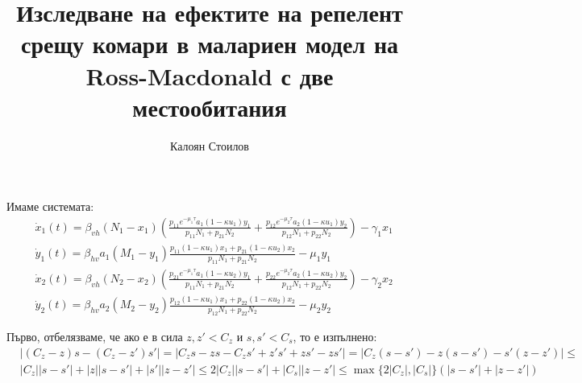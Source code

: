 \documentclass[bulgarian, 12pt]{article}
\title{Изследване на ефектите на репелент срещу комари в малариен модел на Ross-Macdonald с две местообитания}
\author{Калоян Стоилов}
\begin{document}
\maketitle
Имаме системата:
\begin{align*}
  &\dot{x}_1(t) = \beta_{vh} (N_1-x_1) \left(\frac{p_{11} e^{-\mu_1 \tau} a_1 (1-\kappa u_1) y_1}{p_{11} N_1 + p_{21} N_2} + \frac{p_{12} e^{-\mu_2 \tau} a_2 (1-\kappa u_1) y_2}{p_{12} N_1 + p_{22} N_2 }\right) - \gamma_1 x_1 \\
  &\dot{y}_1(t) = \beta_{hv} a_1 (M_1-y_1) \frac{p_{11} (1-\kappa u_1) x_1 + p_{21} (1-\kappa u_2) x_2}{p_{11} N_1 + p_{21} N_2} - \mu_1 y_1 \\
  &\dot{x}_2(t) = \beta_{vh} (N_2-x_2) \left(\frac{p_{21} e^{-\mu_1 \tau} a_1 (1-\kappa u_2) y_1}{p_{11} N_1 + p_{21} N_2 } + \frac{p_{22} e^{-\mu_2 \tau} a_2 (1-\kappa u_2) y_2}{p_{12} N_1 + p_{22} N_2}\right) - \gamma_2 x_2 \\
  &\dot{y}_2(t) = \beta_{hv} a_2 (M_2-y_2) \frac{p_{12} (1-\kappa u_1) x_1 +p_{22} (1-\kappa u_2) x_2}{p_{12} N_1 + p_{22} N_2} - \mu_2 y_2
\end{align*}

Първо, отбелязваме, че ако е в сила $z, z' < C_z$ и $s, s' < C_s$, то е изпълнено:
\begin{align*}
  &|(C_z - z) s - (C_z - z') s'| =
  |C_z s - z s - C_z s' + z' s' + z s' - z s'| =
  |C_z (s - s') - z (s - s') - s' (z - z')| \leq \\
  &|C_z| |s - s'| + |z| |s - s'| + |s'| |z - z'| \leq
  2 |C_z| |s - s'|  + |C_s| |z - z'| \leq
  \max\{2 |C_z|, |C_s|\} (|s-s'| + |z - z'|)
\end{align*}
\end{document}
